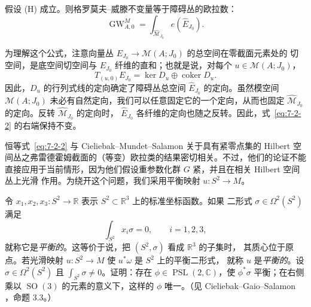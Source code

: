 \begin{theorem}\label{thm:7-2-3}
假设 (H) 成立。则格罗莫夫--威滕不变量等于障碍丛的欧拉数：
\begin{equation}\label{eq:7-2-2}
  \operatorname{GW}^{M}_{A,0}
  =\int_{\widehat{\mathcal M}_{J_0}}e(\widehat E_{J_0}).
\end{equation}
\end{theorem}

为理解这个公式，注意向量丛 $E_{J_0}\to\mathcal M(A;J_0)$ 的总空间在零截面元素处的
切空间，是底空间切空间与 $E_{J_0}$ 纤维的直和；也就是说，对每个
$u\in\mathcal M(A;J_0)$，
\[
  T_{(u,0)}E_{J_0}=\ker D_u\oplus\operatorname{coker}D_u.
\]
因此，$D_u$ 的行列式线的定向确定了障碍丛总空间 $\widehat E_{J_0}$ 的定向。虽然模空间
$\mathcal M(A;J_0)$ 未必有自然定向，我们可以任意固定它的一个定向，从而也固定
$\widehat{\mathcal M}_{J_0}$ 的定向。反转 $\widehat{\mathcal M}_{J_0}$ 的定向时，
$\widehat E_{J_0}$ 各纤维的定向也随之反转。因此，式~\eqref{eq:7-2-2} 的右端保持不变。

恒等式~\eqref{eq:7-2-2} 与 Cieliebak--Mundet--Salamon  关于具有紧零点集的
Hilbert 空间丛之弗雷德霍姆截面的（等变）欧拉类的结果密切相关。不过，他们的论证不能
直接应用于当前情形，因为他们假设重参数化群 $G$ 紧，并且在相关 Hilbert 空间丛上光滑
作用。为绕开这个问题，我们采用平衡映射 $u:S^2\to M$。

\begin{exercise}\label{ex:7-2-4}
令 $x_1,x_2,x_3:S^2\to\mathbb R$ 表示 $S^2\subset\mathbb R^3$ 上的标准坐标函数。如果
二形式 $\sigma\in\Omega^2(S^2)$ 满足
\begin{equation}\label{eq:7-2-3}
  \int_{S^2}x_i\sigma=0,
  \qquad i=1,2,3,
\end{equation}
就称它是\emph{平衡的}。这等价于说，把 $(S^2,\sigma)$ 看成 $\mathbb R^3$ 的子集时，
其质心位于原点。若光滑映射 $u:S^2\to M$ 使 $u^*\omega$ 是 $S^2$ 上的平衡二形式，
就称 $u$ 是\emph{平衡的}。设 $\sigma\in\Omega^2(S^2)$ 且
$\int_{S^2}\sigma\ne0$。证明：存在 $\phi\in\operatorname{PSL}(2,\mathbb C)$，使
$\phi^*\sigma$ 平衡；在右侧乘以 $\operatorname{SO}(3)$ 的元素的意义下，这样的 $\phi$
唯一。（见 Cieliebak--Gaio--Salamon ，命题 3.3。）
\end{exercise}

